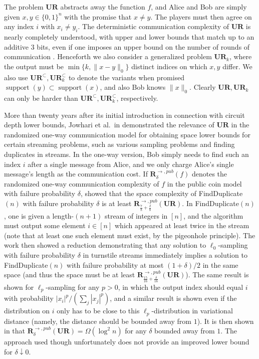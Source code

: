 \documentclass[11pt]{article}
\newcommand{\supp}{\mathop{support}}
\newcommand{\ur}{\mathbf{UR}\xspace}
\newcommand{\randcom}{\mathbf{R}}
\newcommand{\findup}[1]{\textsf{FindDuplicate}$({#1})$\xspace}
\begin{document}
The problem $\ur$ abstracts away the function $f$, and Alice and Bob are simply given $x,y\in\{0,1\}^n$ with the promise that $x\neq y$. The players must then agree on any index $i$ with $x_i\neq y_i$. The deterministic communication complexity of $\ur$ is nearly completely understood, with upper and lower bounds that match up to an additive $3$ bits, even if one imposes an upper bound on the number of rounds of communication \cite{TardosZ97}. Henceforth we also consider a generalized problem $\ur_k$, where the output must be $\min\{k, \|x-y\|_0\}$ distinct indices on which $x, y$ differ. We also use $\ur^{\subset}, \ur_k^{\subset}$ to denote the variants when promised $\supp(y)\subset \supp(x)$, and also Bob knows $\|x\|_0$. Clearly $\ur, \ur_k$ can only be harder than $\ur^\subset, \ur_k^\subset$, respectively.

More than twenty years after its initial introduction in connection with circuit depth lower bounds, Jowhari et al.\ in \cite{JowhariST11} demonstrated the relevance of $\ur$ in the randomized one-way communication model for obtaining space lower bounds for certain streaming problems, such as various sampling problems and finding duplicates in streams. In the one-way version, Bob simply needs to find such an index $i$ after a single message from Alice, and we only charge Alice's single message's length as the communication cost. If $\randcom^{\rightarrow,pub}_\delta(f)$ denotes the randomized one-way communication complexity of $f$ in the public coin model with failure probability $\delta$, \cite{JowhariST11} showed that the space complexity of \findup{n} with failure probability $\delta$ is at least $\randcom^{\rightarrow,pub}_{\frac 78 + \frac{\delta}8}(\ur)$. In \findup{n}, one is given a length-$(n+1)$ stream of integers in $[n]$, and the algorithm must output some element $i\in[n]$ which appeared at least twice in the stream (note that at least one such element must exist, by the pigeonhole principle). The work \cite{JowhariST11} then showed a reduction demonstrating that any solution to $\ell_0$-sampling with failure probability $\delta$ in turnstile streams immediately implies a solution to \findup{n} with failure probability at most $(1+\delta)/2$ in the same space (and thus the space must be at least $\randcom^{\rightarrow,pub}_{\frac{15}{16} + \frac{\delta}{16}}(\ur)$). The same result is shown for $\ell_p$-sampling for any $p>0$, in which the output index should equal $i$ with probability $|x_i|^p/(\sum_j |x_j|^p)$, and a similar result is shown even if the distribution on $i$ only has to be close to this $\ell_p$-distribution in variational distance (namely, the distance should be bounded away from $1$). It is then shown in \cite{JowhariST11} that $\randcom^{\rightarrow,pub}_\delta(\ur) = \Omega(\log^2 n)$ for any $\delta$ bounded away from $1$. The approach used though unfortunately does not provide an improved lower bound for $\delta\downarrow 0$.
\end{document}
